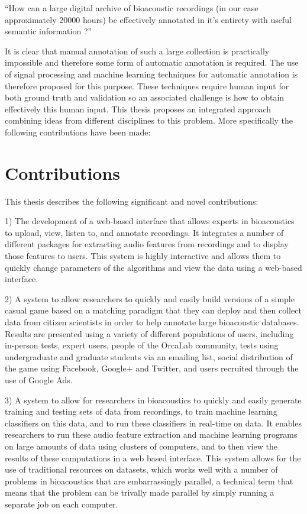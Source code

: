 ``How can a large digital archive of bioacoustic recordings (in our
case approximately 20000 hours) be effectively annotated in it's
entirety with useful semantic information ?''

It is clear that manual annotation of such a large collection is
practically impossible and therefore some form of automatic annotation
is required. The use of signal processing and machine learning
techniques for automatic annotation is therefore proposed for this
purpose. These techniques require human input for both ground truth
and validation so an associated challenge is how to obtain effectively
this human input. This thesis proposes an integrated approach combining
ideas from different disciplines to this problem. More specifically
the following contributions have been made:

\section{Contributions}

This thesis describes the following significant and novel
contributions:

1) The development of a web-based interface that allows experts in
bioacoustics to upload, view, listen to, and annotate recordings.  It
integrates a number of different packages for extracting audio
features from recordings and to display those features to users.  This
system is highly interactive and allows them to quickly change
parameters of the algorithms and view the data using a web-based
interface.

2) A system to allow researchers to quickly and easily build versions
of a simple casual game based on a matching paradigm that they can
deploy and then collect data from citizen scientists in order to help
annotate large bioacoustic databases.  Results are presented using a
variety of different populations of users, including in-person tests,
expert users, people of the OrcaLab community, tests using
undergraduate and graduate students via an emailing list, social
distribution of the game using Facebook, Google+ and Twitter, and
users recruited through the use of Google Ads.

3) A system to allow for researchers in bioacoustics to quickly and
easily generate training and testing sets of data from recordings, to
train machine learning classifiers on this data, and to run these
classifiers in real-time on data.  It enables researchers to run these
audio feature extraction and machine learning programs on large
amounts of data using clusters of computers, and to then view the
results of these computations in a web based interface.  This system
allows for the use of traditional resources on datasets, which works
well with a number of problems in bioacoustics that are embarrassingly
parallel, a technical term that means that the problem can be trivally
made parallel by simply running a separate job on each computer.

